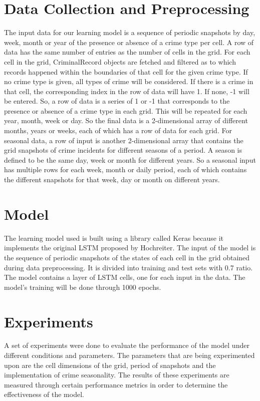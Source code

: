 \section{Data Collection and Preprocessing}
    The input data for our learning model is a sequence of periodic snapshots by day, week, month or year of the presence or absence of a crime type per cell. A row of data has the same number of entries as the number of cells in the grid. For each cell in the grid, CriminalRecord objects are fetched and filtered as to which records happened within the boundaries of that cell for the given crime type. If no crime type is given, all types of crime will be considered. If there is a crime in that cell, the corresponding index in the row of data will have 1. If none, -1 will be entered. So, a row of data is a series of 1 or -1 that corresponds to the presence or absence of a crime type in each grid. This will be repeated for each year, month, week or day. So the final data is a 2-dimensional array of different months, years or weeks, each of which has a row of data for each grid.
    For seasonal data, a row of input is another 2-dimensional array that contains the grid snapshots of crime incidents for different seasons of a period. A season is defined to be the same day, week or month for different years. So a seasonal input has multiple rows for each week, month or daily period, each of which contains the different snapshots for that week, day or month on different years.

\section{Model}
    The learning model used is built using a library called Keras because it implements the original LSTM proposed by Hochreiter. The input of the model is the sequence of periodic snapshots of the states of each cell in the grid obtained during data preprocessing. It is divided into training and test sets with 0.7 ratio. The model contains a layer of LSTM cells, one for each input in the data. The model's training will be done through 1000 epochs.

\section{Experiments}
    A set of experiments were done to evaluate the performance of the model under different conditions and parameters. The parameters that are being experimented upon are the cell dimensions of the grid, period of snapshots and the implementation of crime seasonality. The results of these experiments are measured through certain performance metrics in order to determine the effectiveness of the model.


